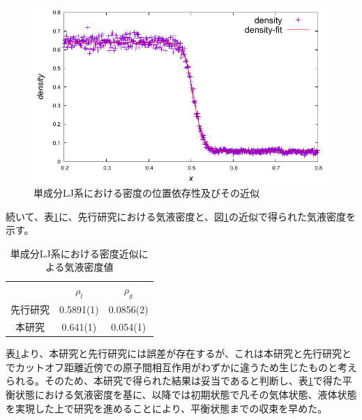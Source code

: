 \documentclass[titlepage]{jsreport}
\begin{document}
\begin{figure}[htbp]
    \begin{center}
        \includegraphics[width=14cm]{fig/ln78732-rn10976-ld0.629856-rd0.087808/ln78732-rn10976-ld0.629856-rd0.087808-fitting.pdf}
    \end{center}
    \caption{単成分LJ系における密度の位置依存性及びその近似}
    \label{fig:ln78732-rn10976-ld0.629856-rd0.087808-fitting}
\end{figure}

続いて、表\ref{table:ln78732-rn10976-ld0.629856-rd0.087808-fitting}に、先行研究\cite{gas-liquid-equilibrium}における気液密度と、図\ref{fig:ln78732-rn10976-ld0.629856-rd0.087808-fitting}の近似で得られた気液密度を示す。

\begin{table}[htbp]
    \begin{center}
        \caption{単成分LJ系における密度近似による気液密度値}
        \label{table:ln78732-rn10976-ld0.629856-rd0.087808-fitting}
            \begin{tabular}{c || c | c}
                & $\rho_l$ & $\rho_g$ \\
                先行研究 & 0.5891(1) & 0.0856(2) \\
                本研究 & 0.641(1) & 0.054(1)
            \end{tabular}
    \end{center}
\end{table}

表\ref{table:ln78732-rn10976-ld0.629856-rd0.087808-fitting}より、本研究と先行研究には誤差が存在するが、これは本研究と先行研究とでカットオフ距離近傍での原子間相互作用がわずかに違うため生じたものと考えられる。そのため、本研究で得られた結果は妥当であると判断し、表\ref{table:ln78732-rn10976-ld0.629856-rd0.087808-fitting}で得た平衡状態における気液密度を基に、以降では初期状態で凡その気体状態、液体状態を実現した上で研究を進めることにより、平衡状態までの収束を早めた。
\end{document}
